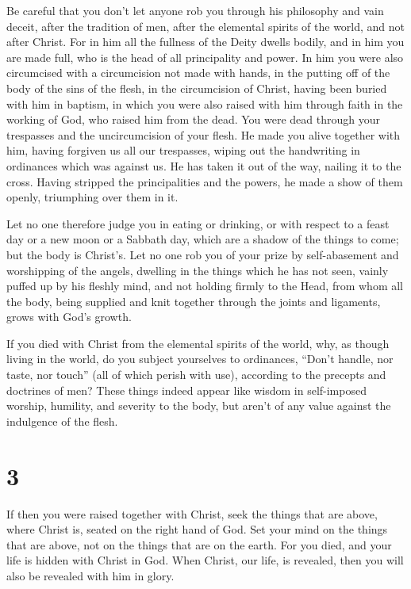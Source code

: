  Be careful that you don't let anyone rob you through his
philosophy and vain deceit, after the tradition of men, after the
elemental spirits of the world, and not after Christ.  For
in him all the fullness of the Deity dwells bodily,  and
in him you are made full, who is the head of all principality and power.
 In him you were also circumcised with a circumcision not
made with hands, in the putting off of the body of the sins of the
flesh, in the circumcision of Christ,  having been buried
with him in baptism, in which you were also raised with him through
faith in the working of God, who raised him from the dead.
 You were dead through your trespasses and the
uncircumcision of your flesh. He made you alive together with him,
having forgiven us all our trespasses,  wiping out the
handwriting in ordinances which was against us. He has taken it out of
the way, nailing it to the cross.  Having stripped the
principalities and the powers, he made a show of them openly, triumphing
over them in it.

 Let no one therefore judge you in eating or drinking, or
with respect to a feast day or a new moon or a Sabbath day,
 which are a shadow of the things to come; but the body
is Christ's.  Let no one rob you of your prize by
self-abasement and worshipping of the angels, dwelling in the things
which he has not seen, vainly puffed up by his fleshly mind,
 and not holding firmly to the Head, from whom all the
body, being supplied and knit together through the joints and ligaments,
grows with God's growth.

 If you died with Christ from the elemental spirits of
the world, why, as though living in the world, do you subject yourselves
to ordinances,  ``Don't handle, nor taste, nor touch''
 (all of which perish with use), according to the
precepts and doctrines of men?  These things indeed
appear like wisdom in self-imposed worship, humility, and severity to
the body, but aren't of any value against the indulgence of the flesh.

\hypertarget{section-2}{%
\section{3}\label{section-2}}

 If then you were raised together with Christ, seek the
things that are above, where Christ is, seated on the right hand of God.
 Set your mind on the things that are above, not on the
things that are on the earth.  For you died, and your life
is hidden with Christ in God.  When Christ, our life, is
revealed, then you will also be revealed with him in glory.

